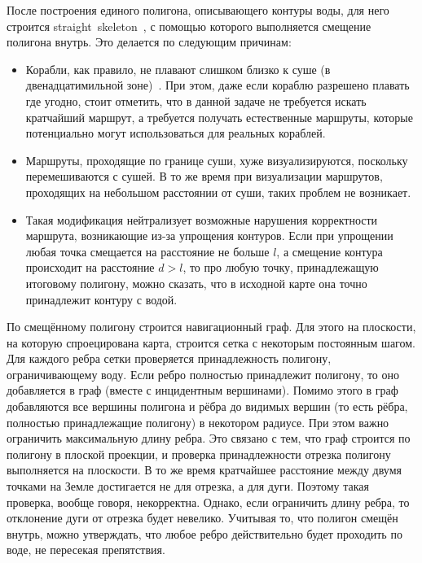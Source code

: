 После построения единого полигона, описывающего контуры воды, для него
строится straight~skeleton~\cite{aichholzer1996straight}, с помощью
которого выполняется смещение полигона внутрь. Это делается по
следующим причинам:
\begin{itemize}
    \item Корабли, как правило, не плавают слишком близко к суше (в
      двенадцатимильной зоне)~\cite{o1984international}. При этом, даже
      если кораблю разрешено плавать где угодно, стоит отметить, что в
      данной задаче не требуется искать кратчайший маршрут, а требуется
      получать естественные маршруты, которые потенциально могут
      использоваться для реальных кораблей.
    \item Маршруты, проходящие по границе суши, хуже визуализируются,
      поскольку перемешиваются с сушей. В то же время при визуализации
      маршрутов, проходящих на небольшом расстоянии от суши, таких
      проблем не возникает.
    \item Такая модификация нейтрализует возможные нарушения
      корректности маршрута, возникающие из-за упрощения контуров.
      Если при упрощении любая точка смещается на расстояние не больше
      $l$, а смещение контура происходит на расстояние $d > l$, то про
      любую точку, принадлежащую итоговому полигону, можно сказать,
      что в исходной карте она точно принадлежит контуру с водой.
\end{itemize}

По смещённому полигону строится навигационный граф. Для этого на
плоскости, на которую спроецирована карта, строится сетка с некоторым
постоянным шагом. Для каждого ребра сетки проверяется принадлежность
полигону, ограничивающему воду. Если ребро полностью принадлежит
полигону, то оно добавляется в граф (вместе с инцидентным вершинами).
Помимо этого в граф добавляются все вершины полигона и рёбра до
видимых вершин (то есть рёбра, полностью принадлежащие полигону) в
некотором радиусе. При этом важно ограничить максимальную длину ребра.
Это связано с тем, что граф строится по полигону в плоской проекции, и
проверка принадлежности отрезка полигону выполняется на плоскости. В
то же время кратчайшее расстояние между двумя точками на Земле
достигается не для отрезка, а для дуги. Поэтому такая проверка, вообще
говоря, некорректна. Однако, если ограничить длину ребра, то
отклонение дуги от отрезка будет невелико. Учитывая то, что полигон
смещён внутрь, можно утверждать, что любое ребро действительно будет
проходить по воде, не пересекая препятствия.


